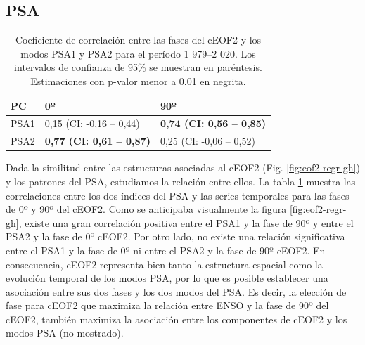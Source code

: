 \documentclass[12pt,oneside,a4paper]{reedthesis}
\begin{document}
\hypertarget{psa}{%
\subsection{PSA}\label{psa}}





\begin{table}

\caption{\label{tab:psa-eof2}Coeficiente de correlación entre las fases del cEOF2 y los modos PSA1 y PSA2 para el período 1 979--2 020.
Los intervalos de confianza de 95\% se muestran en paréntesis.
Estimaciones con p-valor menor a 0.01 en negrita.}
\centering
\begin{tabular}[t]{l>{}l>{}l}
\toprule
PC & 0º & 90º\\
\midrule
PSA1 & 0,15 (CI: -0,16 -- 0,44) & \textbf{0,74 (CI: 0,56 -- 0,85)}\\
\cmidrule{1-3}
PSA2 & \textbf{0,77 (CI: 0,61 -- 0,87)} & 0,25 (CI: -0,06 -- 0,52)\\
\bottomrule
\end{tabular}
\end{table}

Dada la similitud entre las estructuras asociadas al cEOF2 (Fig. \ref{fig:eof2-regr-gh}) y los patrones del PSA, estudiamos la relación entre ellos.
La tabla \ref{tab:psa-eof2} muestra las correlaciones entre los dos índices del PSA y las series temporales para las fases de 0º y 90º del cEOF2.
Como se anticipaba visualmente la figura \ref{fig:eof2-regr-gh}, existe una gran correlación positiva entre el PSA1 y la fase de 90º y entre el PSA2 y la fase de 0º cEOF2.
Por otro lado, no existe una relación significativa entre el PSA1 y la fase de 0º ni entre el PSA2 y la fase de 90º cEOF2.
En consecuencia, cEOF2 representa bien tanto la estructura espacial como la evolución temporal de los modos PSA, por lo que es posible establecer una asociación entre sus dos fases y los dos modos del PSA.
Es decir, la elección de fase para cEOF2 que maximiza la relación entre ENSO y la fase de 90º del cEOF2, también maximiza la asociación entre los componentes de cEOF2 y los modos PSA (no mostrado).
\end{document}
